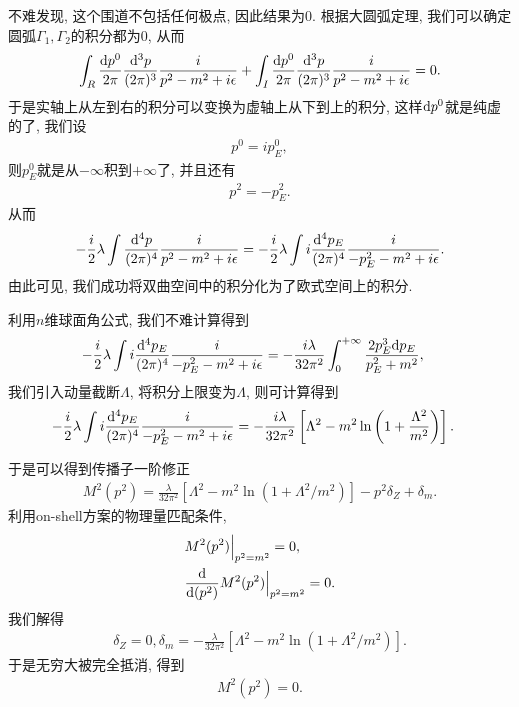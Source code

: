 不难发现, 这个围道不包括任何极点, 因此结果为$0$. 根据大圆弧定理, 我们可以确定圆弧$\Gamma_1, \Gamma_2$的积分都为$0$, 从而
\begin{align}
    \int_R\frac{\mathrm d p^0}{2\pi}\frac{\mathrm d^3p}{(2\pi)^3}\frac i{p^2-m^2+i\epsilon}+\int_I\frac{\mathrm d p^0}{2\pi}\frac{\mathrm d^3p}{(2\pi)^3}\frac i{p^2-m^2+i\epsilon}=0.
\end{align}
于是实轴上从左到右的积分可以变换为虚轴上从下到上的积分, 这样$\mathrm d p^0$就是纯虚的了, 我们设
\begin{align}
    p^0=ip_E^0, 
\end{align}
则$p_E^0$就是从$-\infty$积到$+\infty$了, 并且还有
\begin{align}
    p^2=-p_E^2.
\end{align}
从而
\begin{align}
    -\frac i2\lambda\int\frac{\mathrm d^4p}{(2\pi)^4}\frac i{p^2-m^2+i\epsilon}=-\frac i2\lambda\int i\frac{\mathrm d^4p_E}{(2\pi)^4}\frac{i}{-p_E^2-m^2+i\epsilon}.
\end{align}
由此可见, 我们成功将双曲空间中的积分化为了欧式空间上的积分.

利用$n$维球面角公式, 我们不难计算得到
\begin{align}
    -\frac i2\lambda\int i\frac{\mathrm d^4p_E}{(2\pi)^4}\frac{i}{-p_E^2-m^2+i\epsilon}&=-\frac{i\lambda}{32\pi^2}\int_0^{+\infty}\frac{2p_E^3\mathrm d p_E}{p_E^2+m^2},
\end{align}
我们引入动量截断$\Lambda$, 将积分上限变为$\Lambda$, 则可计算得到
\begin{align}
    -\frac i2\lambda\int i\frac{\mathrm d^4p_E}{(2\pi)^4}\frac{i}{-p_E^2-m^2+i\epsilon}&=-\frac{i\lambda}{32\pi^2}\left[\Lambda^2-m^2\ln\left(1+\frac{\Lambda^2}{m^2}\right)\right].
\end{align}

于是可以得到传播子一阶修正
\begin{align}
    M^2(p^2)=\frac\lambda{32\pi^2}\left[\Lambda^2-m^2\ln\left(1+\Lambda^2/m^2\right)\right]-p^2\delta_Z+\delta_m.
\end{align}
利用on-shell方案的物理量匹配条件, 
\begin{align}
    &M^2(p^2)\Big|_{p^2=m^2}=0,\notag\\
    &\frac{\mathrm d}{\mathrm d(p^2)}M^2(p^2)\Big|_{p^2=m^2}=0.\notag
\end{align}
我们解得
\begin{align}
    \delta_Z=0, \delta_m=-\frac\lambda{32\pi^2}\left[\Lambda^2-m^2\ln\left(1+\Lambda^2/m^2\right)\right].
\end{align}
于是无穷大被完全抵消, 得到
\begin{align}
    M^2(p^2)=0.
\end{align}

